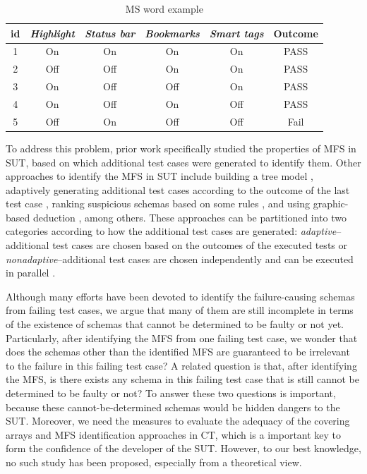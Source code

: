 \begin{table}
\caption{MS word example} \centering
  \label{MS_word}
  \setlength{\tabcolsep}{3pt}
  \begin{tabular}{c|cccc|c}\hline
id& \emph{Highlight} & \emph{Status bar} & \emph{Bookmarks}& \emph{Smart tags} & \bfseries{Outcome} \\\hline
1& On & On & On& On & PASS\\ \hline
2& Off & Off & On & On & PASS\\ \hline
3&On & Off & Off &On&  PASS\\ \hline
4&On & Off &On & Off&  PASS\\ \hline
5&Off&	On&	Off&Off & Fail\\ \hline
  \end{tabular}
\end{table}

To address this problem, prior work \cite{nie2011minimal} specifically studied the properties of MFS in SUT, based on which additional test cases were generated to identify them. Other approaches to identify the MFS in SUT include building a tree model \cite{yilmaz2006covering}, adaptively generating additional test cases according to the outcome of the last test case \cite{zhang2011characterizing}, ranking suspicious schemas based on some rules \cite{ghandehari2012identifying}, and using graphic-based deduction \cite{martinez2008algorithms}, among others. These approaches can be partitioned into two categories \cite{colbourn2008locating} according to how the additional test cases are generated: \emph{adaptive}--additional test cases are chosen based on the outcomes of the executed tests \cite{shi2005software,nie2011minimal,ghandehari2012identifying,niu2013identifying,zhang2011characterizing,shakya2012isolating,wang2010adaptive,li2012improved}or \emph{nonadaptive}--additional test cases are chosen independently and can be executed in parallel \cite{yilmaz2006covering,colbourn2008locating,martinez2008algorithms,martinez2009locating,zhang2012faulty}.

Although many efforts have been devoted to identify the failure-causing schemas from failing test cases, we argue that many of them are still incomplete in terms of the existence of schemas that cannot be determined to be faulty or not yet. Particularly, after identifying the MFS from one failing test case, we wonder that does the schemas other than the identified MFS are guaranteed to be irrelevant to the failure in this failing test case?  A related question is that, after identifying the MFS, is there exists any schema in this failing test case that is still cannot be determined to be faulty or not? To answer these two questions is important, because these cannot-be-determined schemas would be hidden dangers to the SUT. Moreover, we need the measures to evaluate the adequacy of the covering arrays and MFS identification approaches in CT, which is a important key to form the confidence of the developer of the SUT.  However, to our best knowledge, no such study has been proposed, especially from a theoretical view.

